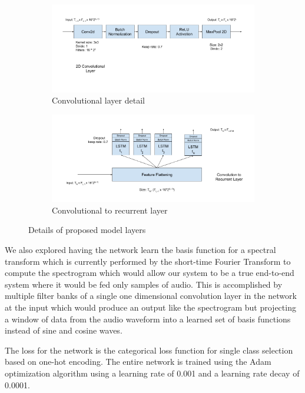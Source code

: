 \documentclass{article}
\begin{document}
\begin{figure}
  \begin{subfigure}{.45\textwidth}
    \includegraphics[width=\linewidth]{images/crnn-conv_layer}
    \caption{Convolutional layer detail}
    \label{fig:crnn-conv}
  \end{subfigure}%
  \begin{subfigure}{.45\textwidth}
    \includegraphics[width=\linewidth]{images/crnn-lstm_layer}
    \caption{Convolutional to recurrent layer}
    \label{fig:crnn-lstm}
  \end{subfigure}
  \caption{Details of proposed model layers}
\end{figure}

We also explored having the network learn the basis function for a
spectral transform which is currently performed by the short-time
Fourier Transform to compute the spectrogram which would allow our
system to be a true end-to-end system where it would be fed only
samples of audio. This is accomplished by multiple filter banks of a
single one dimensional convolution
layer in the network at the input which would produce an output like the
spectrogram but projecting a window of data from the audio waveform
into a learned set of basis functions instead of sine and cosine waves.

The loss for the network is the categorical loss function for single
class selection based on one-hot encoding. The entire network is
trained using the Adam optimization algorithm using a learning rate of
0.001 and a learning rate decay of 0.0001.
\end{document}
